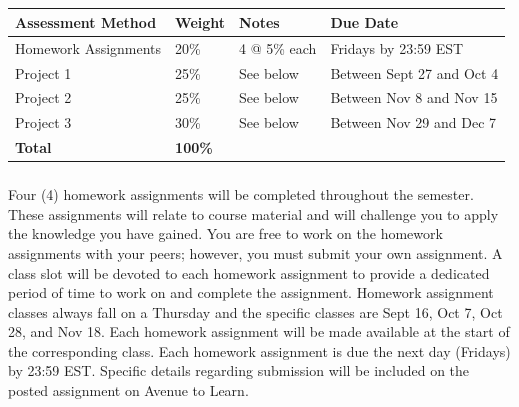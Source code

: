 \documentclass[hidelinks,11pt]{article}
\begin{document}
\subsection*{{}}
\begin{tabular}{p{}p{}p{}p{}}
\hline
  \rowcolor{lightgray} 
  \textbf{Assessment Method}  & \textbf{Weight} & \textbf{Notes}  & \textbf{Due Date}           \\ 
\hline
  Homework Assignments        & 20\%            & 4 @ 5\% each    & Fridays by 23:59 EST        \\ 
  Project 1                   & 25\%            & See below       & Between Sept 27 and Oct 4   \\
  Project 2                   & 25\%            & See below       & Between Nov 8 and Nov 15    \\
  Project 3                   & 30\%            & See below       & Between Nov 29 and Dec 7    \\
\hline
  \textbf{Total}				      & \textbf{100\%}  &                 &                             \\
\hline
\end{tabular}

\vspace{-1em}\subsubsection*{{}}
Four (4) homework assignments will be completed throughout the semester. These assignments will relate to course material and will challenge you to apply the knowledge you have gained. You are free to work on the homework assignments with your peers; however, you must submit your own assignment. A class slot will be devoted to each homework assignment to provide a dedicated period of time to work on and complete the assignment. Homework assignment classes always fall on a Thursday and the specific classes are Sept 16, Oct 7, Oct 28, and Nov 18. Each homework assignment will be made available at the start of the corresponding class. Each homework assignment is due the next day (Fridays) by 23:59 EST. Specific details regarding submission will be included on the posted assignment on Avenue to Learn.
\end{document}
